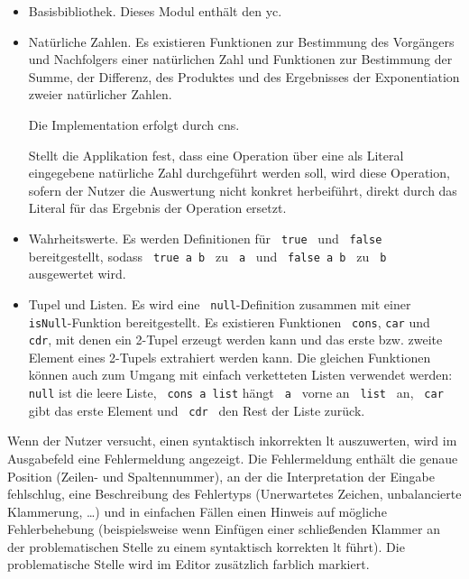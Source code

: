 \documentclass[parskip=full,11pt,twoside]{scrartcl}
\begin{document}
\begin{itemize}
	\item Basisbibliothek. Dieses Modul enthält den \gls{yc}.
	
	\item Natürliche Zahlen. Es existieren Funktionen zur Bestimmung des Vorgängers
	und Nachfolgers einer natürlichen Zahl und Funktionen zur Bestimmung der Summe,
	der Differenz, des Produktes und des Ergebnisses der Exponentiation zweier
	natürlicher Zahlen.
	
	Die Implementation erfolgt durch \glspl{cn}.

	Stellt die Applikation fest, dass eine Operation über eine als Literal
	eingegebene natürliche Zahl durchgeführt werden soll, wird diese Operation, sofern
	der Nutzer die Auswertung nicht konkret herbeiführt, direkt durch das Literal
	für das Ergebnis der Operation ersetzt.
	
	\item Wahrheitswerte. Es werden Definitionen für \texttt{ true } und \texttt{ false }
	bereitgestellt, sodass \texttt{ true a b } zu \texttt{ a } und \texttt{ false a b }
	zu \texttt{ b } ausgewertet wird.
	
	\item Tupel und Listen. Es wird eine \texttt{ null}-Definition zusammen mit einer
	\texttt{ isNull}-Funktion bereitgestellt. Es existieren Funktionen
	\texttt{ cons}, \texttt{car} und \texttt{ cdr}, %
	mit denen ein 2-Tupel erzeugt werden kann und das erste bzw. zweite Element
	eines 2-Tupels extrahiert werden kann. Die gleichen Funktionen können auch zum
	Umgang mit einfach verketteten Listen verwendet werden: \texttt{null} ist die
	leere Liste, \texttt{ cons a list} hängt \texttt{ a } vorne an \texttt{ list } an,
	\texttt{ car } gibt das erste Element und \texttt{ cdr } den Rest der Liste zurück.
\end{itemize}

Wenn der Nutzer versucht, einen syntaktisch inkorrekten \gls{lt} auszuwerten,
wird im Ausgabefeld eine Fehlermeldung angezeigt. Die Fehlermeldung enthält die genaue Position (Zeilen-
und Spaltennummer), an der die Interpretation der Eingabe fehlschlug, eine Beschreibung
des Fehlertyps (Unerwartetes Zeichen, unbalancierte Klammerung, \ldots) und in einfachen
Fällen einen Hinweis auf mögliche Fehlerbehebung (beispielsweise wenn Einfügen einer
schließenden Klammer an der problematischen Stelle zu einem syntaktisch korrekten
\gls{lt} führt).
Die problematische Stelle wird im Editor zusätzlich farblich markiert.
\end{document}
